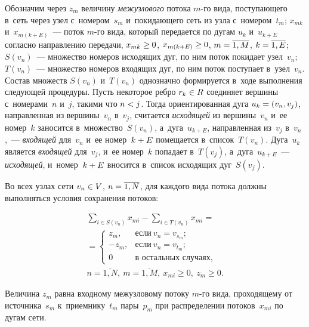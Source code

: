\begin{multicols}{2}
Обозначим через $z_m$ величину \textit{межузлового} потока $m$-го вида, 
поступающего в~сеть через узел с~номером~$s_m$ и~покидающего сеть из узла с~номером~$t_m$;
$x_{mk}$ и~$x_{m(k + E)}$~---  поток $m$-го вида, который передается по дугам 
$u_k$ и~$u_{k + E}$ согласно направлению передачи, $x_{mk} \hm\ge 0$, $x_{m(k + 
E)}\hm\ge 0$, $m \hm= \overline{1, M}$, $k \hm= \overline {1, E}$;
$S(v_n)$~--- множество номеров исходящих дуг, по ним поток покидает узел~$v_n$;
$T(v_n)$~--- множество номеров входящих дуг, по ним поток поступает в~узел~$v_n$.
Состав множеств $S(v_n)$ и~$T(v_n)$ однозначно формируется в~ходе выполнения 
следующей процедуры. Пусть некоторое ребро $r_k \hm\in R$ соединяет вершины 
с~номерами~$n$ и~$j$, такими что $n \hm< j$. Тогда ориентированная дуга $u_k\hm = (v_n, 
v_j)$, направленная из вершины~$v_n$ в~$v_j$, считается \textit{исходящей} из 
вершины~$v_{n}$ и~ее номер~$k$ заносится в~множество~$S(v_n)$, 
а~дуга~$u_{k+E}$, направленная из~$v_j$ в~$v_n$,~--- \textit{входящей} для~$v_{n}$ и~ее номер~$k\hm+E$ помещается в~список~$T(v_n)$.
Дуга~$u_k$ является \textit{входящей} для~$v_j$, и~ее номер~$k$ попадает 
в~$T(v_j)$, а~дуга~$u_{k+E}$~--- \textit{исходящей}, и~номер~$k\hm+E$ вносится в~список исходящих дуг~$S(v_j)$.

Во всех узлах сети $v_n \hm\in V$, $n \hm= \overline{1,N}$,  для каждого вида потока должны 
выполняться условия сохранения потоков:

\vspace*{-4pt}

\noindent
\begin{multline}
\sum\limits_{i \in S(v_n)}{x_{mi}} - \sum\limits_{i \in T(v_n)}{x_{mi}} ={}\\
{}=
\begin{cases}
 z_m, & \mbox{если}\ v_n = v_{s_m}; \\
- z_m, & \mbox{если}\  v_n = v_{t_m}; \\
 0 & \mbox{в\ остальных\ случаях,}
\end{cases}\\
n = \overline {1, N}, \ m = \overline {1, M}, \ x_{mi} \ge 0, \ z_m \ge 0.
\label{e1-mal}
\end{multline}

\vspace*{-16pt}

\columnbreak

\noindent
Величина $z_m$ равна входному межузловому потоку $m$-го вида, проходящему от 
источника~$s_m$ к~приемнику~$t_m$ пары~$p_m$ при распределении  потоков~$x_{mi}$ 
по дугам сети.


\end{multicols}
